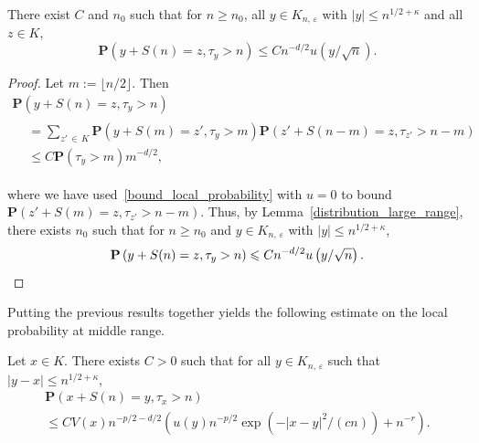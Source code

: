 \documentclass[AHL,Unicode,longabstracts,published]{cedram}
\newcommand{\pr}{\mathbf{P}}
\renewcommand{\epsilon}{\varepsilon}
\renewcommand{\leq}{\leqslant}
\renewcommand{\geq}{\geqslant}
\begin{document}
\begin{lemm}\label{roughBoundLocal}
There exist $C$ and $n_{0}$ such that for $n\geq n_{0}$, all $y\in {K}_{n,\,\epsilon}$ with $|y|\leq n^{1/2+\kappa}$ and all $z\in {K}$,
\[
\pr\left(y+S(n)=z,\tau_{y}>n\right)\leq Cn^{-d/2}u\left(y/\sqrt{n}\right).
\]
\end{lemm}


\begin{proof}
Let $m:=\lfloor n/2\rfloor$. Then
\begin{multline*}
\pr\left(y+S(n)=z,\tau_{y}>n\right)\\
\begin{aligned}
&=\sum_{z'\,\in\,{K}}\pr\left(y+S(m)=z',\tau_{y}>m\right)\pr\left(z'+S(n-m)=z,\tau_{z'}>n-m\right)\\
&\leq C\pr\left(\tau_{y}>m\right)m^{-d/2},
\end{aligned}
\end{multline*}

\noindent where we have used~\eqref{bound_local_probability} with $u=0$ to bound $\pr(z'+S(m)=z,\tau_{z'}>n-m)$. Thus, by Lemma~\ref{distribution_large_range}, there exists $n_{0}$ such that for $n\geq n_{0}$ and $y\in{K}_{n,\,\epsilon}$ with $|y| \leq n^{1/2+\kappa}$,
\[
\pr\left(y+S(n)=z,\tau_{y}>n\right)\leq Cn^{-d/2}u\left(y/\sqrt{n}\right).\qedhere
\]
\end{proof}

Putting the previous results together yields the following estimate on the local probability at middle range.

\begin{prop}\label{bound_local_far_away}
Let $x\in{K}$. There exists $C>0$ such that for all $y\in{K}_{n,\,\epsilon}$ such that $|y-x|\leq n^{1/2+\kappa}$,
\begin{multline*}
\pr\left(x+S(n)=y,\tau_{x}>n\right)\\
\leq CV(x)n^{-p/2-d/2}\left(u(y)n^{-p/2}\exp\left(-|x-y|^{2}/(c n)\right)+ n^{-r}\right).
\end{multline*}
\end{prop}
\end{document}
